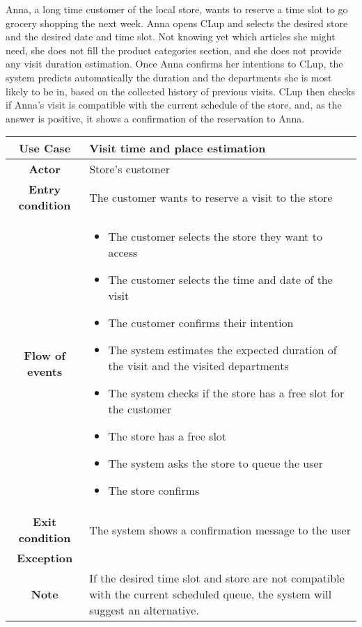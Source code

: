 \documentclass[../../main.tex]{subfiles}
\begin{document}
    Anna, a long time customer of the local store, wants to reserve a time slot to go grocery shopping the next week. 
    Anna opens CLup and selects the desired store and the desired date and time slot. 
    Not knowing yet which articles she might need, she does not fill the product categories section, 
    and she does not provide any visit duration estimation. Once Anna confirms her intentions to CLup, 
    the system predicts automatically the duration and the departments she is most likely to be in, 
    based on the collected history of previous visits. CLup then checks if Anna's visit is compatible with the 
    current schedule of the store, and, as the answer is positive, it shows a confirmation of the reservation to Anna.

    \begin{table}[H]
      \centering
        \begin{tabular}{c m{}}
        \hline
        \textbf{Use Case} & Visit time and place estimation\\ \hline
        \textbf{Actor} & Store's customer\\ \hline
        \textbf{Entry condition} & The customer wants to reserve a visit to the store\\  \hline
        \textbf{Flow of events} & \begin{itemize}
                                    \item The customer selects the store they want to access
                                    \item The customer selects the time and date of the visit
                                    \item The customer confirms their intention
                                    \item The system estimates the expected duration of the visit and the visited departments
                                    \item The system checks if the store has a free slot for the customer
                                    \item The store has a free slot
                                    \item The system asks the store to queue the user
                                    \item The store confirms
                                  \end{itemize}\\ \hline
        \textbf{Exit condition} & The system shows a confirmation message to the user \\ \hline
        \textbf{Exception} & \\ \hline
        \textbf{Note} & If the desired time slot and store are not compatible with the current scheduled queue, the system will suggest an alternative.\\ \hline
        \end{tabular}
    \end{table}



        
\end{document}
